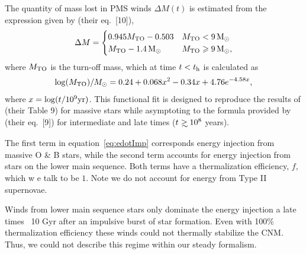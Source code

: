 The quantity of mass lost in PMS winds $\Delta M(t)$ is estimated from
the expression given by \citet{CiottiOstriker:2007a} (their eq.~[10]),
\begin{align}
\Delta M=
\begin{cases}
0.945 M_{\rm TO}-0.503 & M_{\rm TO} < 9 \,{\rm M_\odot}\\
 M_{\rm TO}-1.4 \,{\rm M_\odot} &  M_{\rm TO} \geqslant 9 \,{\rm M_\odot},
\end{cases}
\end{align}
where $M_{\rm TO}$ is the turn-off mass, which at time $t < t_{\rm h}$ is calculated as
\begin{align}
\log(M_{\rm TO})/M_{\odot} =0.24 + 0.068 x^2-0.34 x+4.76 e^{-4.58 x},
\end{align}
where $x=\log(t/10^9 {\rm yr})$.  This functional fit is designed
to reproduce the results of \citet{MaederMeynet:1987a} (their Table 9)
for massive stars while asymptoting to the formula provided by
\citet{CiottiOstriker:2007a} (their eq.~[9]) for intermediate and late
times ($t \gsim 10^8$ years).

The first term in equation~\eqref{eq:edotImp} corresponds energy
injection from massive O \& B stars, while the second term accounts
for energy injection from stars on the lower main sequence. Both terms
have a thermalization efficiency, $f$, which w e talk to be $1$. Note
we do not account for energy from Type II supernovae. 

Winds from lower main sequence stars only dominate the energy
injection a late times ~10 Gyr after an impulsive burst of star
formation. Even with 100\% thermalization efficiency these winds could
not thermally stabilize the CNM. Thus, we could not describe this
regime within our steady formalism.

